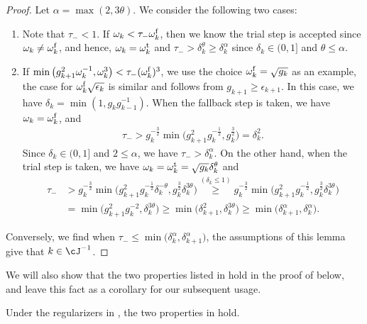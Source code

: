 \begin{proof}
Let $\alpha = \max(2, 3\theta)$.
    We consider the following two cases: %
    \begin{enumerate}
        \item Note that $\tau_- < 1$. If $\omega_k < \tau_- \omega_k^{\mathrm{f}}$, then we know the trial step is accepted since $\omega_k \neq \omega_k^{\mathrm{f}}$, and hence, $\omega_k = \omega_k^{\mathrm{t}}$ and $\tau_- > \delta_k^\theta \geq \delta_k^\alpha$ since $\delta_k \in (0, 1]$ and $\theta \leq \alpha$.
        \item  If $\min\big ( g_{k+1}^2 \omega_k^{-1}, \omega_k^3 \big ) < \tau_- (\omega_k^{\mathrm{f}})^3$,
        we use the choice $\omega_k^{\mathrm{f}} = \sqrt{g_k}$ as an example, the case for $\omega_k^{\mathrm{f}} \sqrt{\epsilon_k}$ is similar and follows from $g_{k+1} \geq \epsilon_{k+1}$.
        In this case, we have $\delta_k = \min(1, g_kg_{k-1}^{-1})$.
        When the fallback step is taken, we have $\omega_k = \omega_k^{\mathrm{f}}$, and
        \begin{align*}
            \tau_- > g_k^{-\frac{3}{2}}\min\big( g_{k+1}^2 g_k^{-\frac{1}{2}}, g_k^{\frac{3}{2}} \big) =  \delta^2_k.
        \end{align*}
        Since $\delta_k \in (0, 1]$ and $2 \leq \alpha$, we have $\tau_- > \delta_k^\alpha$.
    On the other hand, when the trial step is taken, we have $\omega_k = \omega_k^{\mathrm{t}} = \sqrt{g_k} \delta_k^\theta$ and 
    \begin{align*}
    \tau_- 
    &> g_k^{-\frac{3}{2}}\min\big( g_{k+1}^2 g_k^{-\frac{1}{2}} \delta_k^{-\theta}, g_k^{\frac{3}{2}} \delta_k^{3\theta} \big)  
    \overset{(\delta_k \leq 1)}{\geq} 
    g_k^{-\frac{3}{2}}\min\big( g_{k+1}^2 g_k^{-\frac{1}{2}}, g_k^{\frac{3}{2}} \delta_k^{3\theta} \big)  \\
    &= \min\big( g_{k+1}^2 g_k^{-2}, \delta_k^{3\theta} \big)  
    \geq \min\big ( \delta_{k+1}^2, \delta_k^{3\theta}  \big ) 
    \geq \min\big ( \delta_{k+1}^\alpha, \delta_k^\alpha \big ).
    \end{align*}
    \end{enumerate}
    Conversely, we find when $\tau_- \leq \min\big ( \delta_k^\alpha, \delta_{k+1}^\alpha \big )$, 
    the assumptions of this lemma give that $k \in \cJ^{-1}$.
\end{proof}

We will also show that the two properties listed in  hold in the proof of  below, and leave this fact as a corollary for our subsequent usage.
\begin{corollary}
    \label{cor:appendix/decreasing-Mk-condition}
    Under the regularizers in , 
    the two properties in  hold.
\end{corollary}

